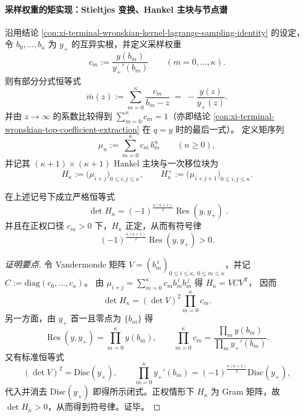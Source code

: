 \paragraph{采样权重的矩实现：Stieltjes 变换、Hankel 主块与节点谱}
沿用结论 \ref{con:xi-terminal-wronskian-kernel-lagrange-sampling-identity} 的设定，令 \(b_0,\dots,b_\kappa\) 为 \(y_{+}\) 的互异实根，并定义采样权重
\[
c_m:=\frac{y(b_m)}{y_{+}'(b_m)}\qquad(m=0,\dots,\kappa).
\]
则有部分分式恒等式
\begin{equation}\label{eq:xi-terminal-wronskian-stieltjes-transform-minus-y-over-yplus}
\bar m(z)
:=\sum_{m=0}^{\kappa}\frac{c_m}{b_m-z}
\;=\;-\frac{y(z)}{y_{+}(z)}.
\end{equation}
并由 \(z\to\infty\) 的系数比较得到 \(\sum_{m=0}^{\kappa}c_m=1\)（亦即结论 \ref{con:xi-terminal-wronskian-top-coefficient-extraction} 在 \(q=y\) 时的最后一式）。
定义矩序列
\[
\mu_n:=\sum_{m=0}^{\kappa}c_m\,b_m^{n}\qquad(n\ge 0),
\]
并记其 \((\kappa+1)\times(\kappa+1)\) Hankel 主块与一次移位块为
\[
H_{\kappa}:=\bigl(\mu_{i+j}\bigr)_{0\le i,j\le \kappa},
\qquad
H_{\kappa}^{+}:=\bigl(\mu_{i+j+1}\bigr)_{0\le i,j\le \kappa}.
\]

\begin{conclusion}\label{con:xi-terminal-wronskian-hankel-principal-determinant-resultant}
在上述记号下成立严格恒等式
\[
\boxed{\;
\det H_{\kappa}
=(-1)^{\frac{\kappa(\kappa+1)}{2}}\operatorname{Res}(y,y_{+})\; }.
\]
并且在正权口径 \(c_m>0\) 下，\(H_{\kappa}\) 正定，从而有符号律
\[
(-1)^{\frac{\kappa(\kappa+1)}{2}}\operatorname{Res}(y,y_{+})>0.
\]
\end{conclusion}
\begin{proof}[证明要点]
令 Vandermonde 矩阵 \(V=(b_m^{\,i})_{0\le i\le \kappa,\,0\le m\le \kappa}\)，并记 \(C:=\mathrm{diag}(c_0,\dots,c_\kappa)\)。
由 \(\mu_{i+j}=\sum_{m=0}^{\kappa}c_m b_m^{\,i}b_m^{\,j}\) 得
\(
H_{\kappa}=VCV^{\mathsf T}
\)，
因而
\[
\det H_{\kappa}=(\det V)^2\prod_{m=0}^{\kappa}c_m.
\]
另一方面，由 \(y_{+}\) 首一且零点为 \(\{b_m\}\) 得
\[
\operatorname{Res}(y,y_{+})=\prod_{m=0}^{\kappa}y(b_m),
\qquad
\prod_{m=0}^{\kappa}c_m=\frac{\prod_m y(b_m)}{\prod_m y_{+}'(b_m)}.
\]
又有标准恒等式
\[
(\det V)^2=\mathrm{Disc}(y_{+}),
\qquad
\prod_{m=0}^{\kappa}y_{+}'(b_m)=(-1)^{\frac{\kappa(\kappa+1)}{2}}\mathrm{Disc}(y_{+}),
\]
代入并消去 \(\mathrm{Disc}(y_{+})\) 即得所示闭式。正权情形下 \(H_{\kappa}\) 为 Gram 矩阵，故 \(\det H_{\kappa}>0\)，从而得到符号律。证毕。
\end{proof}

